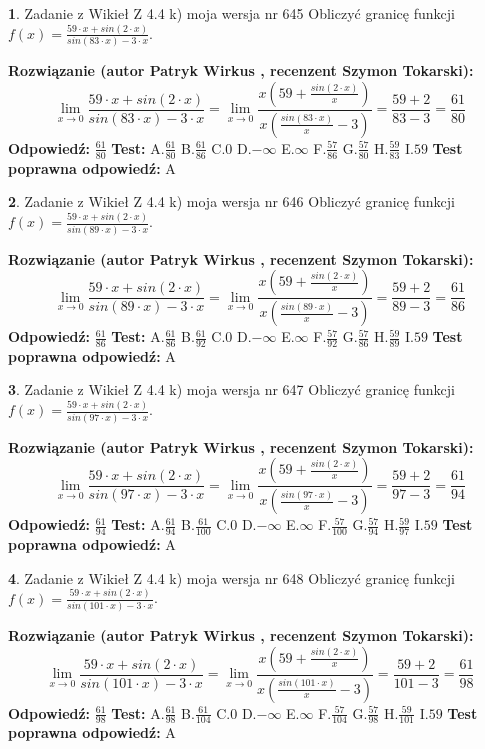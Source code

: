 \documentclass[12pt, a4paper]{article}
\theoremstyle{definition} %
\newtheorem{zad}{}
\newcommand{\zadStart}[1]{\begin{zad}#1\newline}
\newcommand{\zadStop}{\end{zad}}
\newcommand{\rozwStart}[2]{\noindent \textbf{Rozwiązanie (autor #1 , recenzent #2): }\newline}
\newcommand{\rozwStop}{\newline}
\newcommand{\odpStart}{\noindent \textbf{Odpowiedź:}\newline}
\newcommand{\odpStop}{\newline}
\newcommand{\testStart}{\noindent \textbf{Test:}\newline}
\newcommand{\testStop}{\newline}
\newcommand{\kluczStart}{\noindent \textbf{Test poprawna odpowiedź:}\newline}
\newcommand{\kluczStop}{\newline}
\begin{document}
\zadStart{Zadanie z Wikieł Z 4.4 k) moja wersja nr 645}
Obliczyć granicę funkcji $f(x)=\frac{59\cdot x +sin(2\cdot x)}{sin(83\cdot x) -3\cdot x}$.
\zadStop
\rozwStart{Patryk Wirkus}{Szymon Tokarski}
$$\lim\limits_{x\to 0}\frac{59\cdot x +sin(2\cdot x)}{sin(83\cdot x) -3\cdot x}
=\lim\limits_{x\to 0}\frac{x(59+\frac{sin(2\cdot x)}{x})}{x(\frac{sin(83\cdot x)}{x}-3)}
=\frac{59+2}{83-3} = \frac{61}{80}$$
\rozwStop
\odpStart
$\frac{61}{80}$
\odpStop
\testStart
A.$\frac{61}{80}$
B.$\frac{61}{86}$
C.$0$
D.$-\infty$
E.$\infty$
F.$\frac{57}{86}$
G.$\frac{57}{80}$
H.$\frac{59}{83}$
I.$59$
\testStop
\kluczStart
A
\kluczStop



\zadStart{Zadanie z Wikieł Z 4.4 k) moja wersja nr 646}
Obliczyć granicę funkcji $f(x)=\frac{59\cdot x +sin(2\cdot x)}{sin(89\cdot x) -3\cdot x}$.
\zadStop
\rozwStart{Patryk Wirkus}{Szymon Tokarski}
$$\lim\limits_{x\to 0}\frac{59\cdot x +sin(2\cdot x)}{sin(89\cdot x) -3\cdot x}
=\lim\limits_{x\to 0}\frac{x(59+\frac{sin(2\cdot x)}{x})}{x(\frac{sin(89\cdot x)}{x}-3)}
=\frac{59+2}{89-3} = \frac{61}{86}$$
\rozwStop
\odpStart
$\frac{61}{86}$
\odpStop
\testStart
A.$\frac{61}{86}$
B.$\frac{61}{92}$
C.$0$
D.$-\infty$
E.$\infty$
F.$\frac{57}{92}$
G.$\frac{57}{86}$
H.$\frac{59}{89}$
I.$59$
\testStop
\kluczStart
A
\kluczStop



\zadStart{Zadanie z Wikieł Z 4.4 k) moja wersja nr 647}
Obliczyć granicę funkcji $f(x)=\frac{59\cdot x +sin(2\cdot x)}{sin(97\cdot x) -3\cdot x}$.
\zadStop
\rozwStart{Patryk Wirkus}{Szymon Tokarski}
$$\lim\limits_{x\to 0}\frac{59\cdot x +sin(2\cdot x)}{sin(97\cdot x) -3\cdot x}
=\lim\limits_{x\to 0}\frac{x(59+\frac{sin(2\cdot x)}{x})}{x(\frac{sin(97\cdot x)}{x}-3)}
=\frac{59+2}{97-3} = \frac{61}{94}$$
\rozwStop
\odpStart
$\frac{61}{94}$
\odpStop
\testStart
A.$\frac{61}{94}$
B.$\frac{61}{100}$
C.$0$
D.$-\infty$
E.$\infty$
F.$\frac{57}{100}$
G.$\frac{57}{94}$
H.$\frac{59}{97}$
I.$59$
\testStop
\kluczStart
A
\kluczStop



\zadStart{Zadanie z Wikieł Z 4.4 k) moja wersja nr 648}
Obliczyć granicę funkcji $f(x)=\frac{59\cdot x +sin(2\cdot x)}{sin(101\cdot x) -3\cdot x}$.
\zadStop
\rozwStart{Patryk Wirkus}{Szymon Tokarski}
$$\lim\limits_{x\to 0}\frac{59\cdot x +sin(2\cdot x)}{sin(101\cdot x) -3\cdot x}
=\lim\limits_{x\to 0}\frac{x(59+\frac{sin(2\cdot x)}{x})}{x(\frac{sin(101\cdot x)}{x}-3)}
=\frac{59+2}{101-3} = \frac{61}{98}$$
\rozwStop
\odpStart
$\frac{61}{98}$
\odpStop
\testStart
A.$\frac{61}{98}$
B.$\frac{61}{104}$
C.$0$
D.$-\infty$
E.$\infty$
F.$\frac{57}{104}$
G.$\frac{57}{98}$
H.$\frac{59}{101}$
I.$59$
\testStop
\kluczStart
A
\kluczStop
\end{document}
